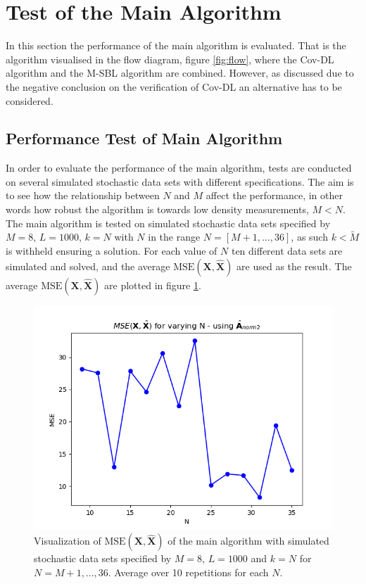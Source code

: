 \section{Test of the Main Algorithm}\label{sec:test_base}
In this section the performance of the main algorithm is evaluated. That is the algorithm visualised in the flow diagram, figure \ref{fig:flow}, where the Cov-DL algorithm and the M-SBL algorithm are combined. However, as discussed due to the negative conclusion on the verification of Cov-DL an alternative has to be considered.  
 
  

\subsection{Performance Test of Main Algorithm}\label{sec:Main_test}
In order to evaluate the performance of the main algorithm, tests are conducted on several simulated stochastic data sets with different specifications. 
The aim is to see how the relationship between $N$ and $M$ affect the performance, in other words how robust the algorithm is towards low density measurements, $M < N$. 
The main algorithm is tested on simulated stochastic data sets specified by $M=8$, $L=1000$, $k=N$ with $N$ in the range $N = [M+1,\dots,36]$, as such $k<\widetilde{M}$ is withheld ensuring a solution.
For each value of $N$ ten different data sets are simulated and solved, and the average $\text{MSE}(\mathbf{X}, \hat{\mathbf{X}})$ are used as the result. 
The average $\text{MSE}(\mathbf{X}, \hat{\mathbf{X}})$ are plotted in figure \ref{fig:varyN1}.
\begin{figure}[H]
    \centering
	\includegraphics[scale=0.5]{figures/ch_6/varyN1.png}
	\caption{Visualization of $\text{MSE}(\mathbf{X}, \hat{\mathbf{X}})$ of the main algorithm with simulated stochastic data sets specified by $M = 8$, $L=1000$ and $k = N$ for $N = M+1, \hdots , 36$. Average over 10 repetitions for each $N$.}
	\label{fig:varyN1}
\end{figure}
